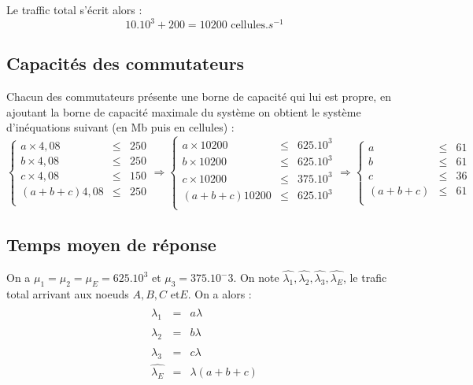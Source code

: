 \documentclass[a4paper, 11pt, fleqn]{article}
\begin{document}
Le traffic total s'écrit alors : $$
10.10^3 + 200 = 10200 \mbox{ cellules}.s^{-1} $$

\subsection{Capacités des commutateurs}

Chacun des commutateurs présente une borne de capacité qui lui est propre, en ajoutant la borne de
capacité maximale du système on obtient le système d'inéquations suivant (en Mb puis en cellules) : $$
\left \lbrace \begin{array}{rcl}
	a \times 4,08 & \leq & 250 \\
	b \times 4,08 & \leq & 250 \\
	c \times 4,08 & \leq & 150 \\
	(a+b+c) 4,08 & \leq & 250 \\
\end{array} \right .
\Longrightarrow 
\left \lbrace \begin{array}{rcl}
	a \times 10200 & \leq & 625. 10^3 \\
	b \times 10200 & \leq & 625. 10^3 \\
	c \times 10200 & \leq & 375. 10^3 \\
	(a+b+c) 10200 & \leq & 625. 10^3 \\
\end{array} \right .
\Longrightarrow
\left \lbrace \begin{array}{rcl}
	a & \leq & 61\\
	b & \leq & 61 \\
	c & \leq & 36 \\
	(a+b+c) & \leq & 61 \\
\end{array} \right .
$$

\subsection{Temps moyen de réponse}

On a $\mu_1 = \mu_2 = \mu_E = 625.10^3$ et $\mu_3 = 375.10^-3$. On note $\hat{\lambda_1},
\hat{\lambda_2}, \hat{\lambda_3}, \hat{\lambda_E}$, le trafic total arrivant aux noeuds $A, B, C \mbox{ et
} E$. On a alors : $$
\begin{array}{rcl}
	\hat{\lambda_1} & = & a \lambda \\
	\hat{\lambda_2} & = & b \lambda \\
	\hat{\lambda_3} & = & c \lambda \\
	\hat{\lambda_E} & = & \lambda(a+b+c) \\
\end{array} $$
\end{document}

